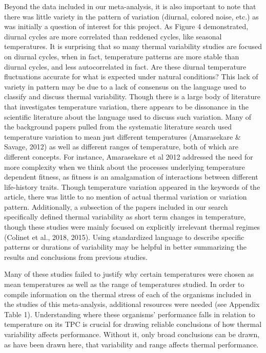 \documentclass[12pt,twoside]{reedthesis}
\begin{document}
Beyond the data included in our meta-analysis, it is also important to note that there was little variety in the pattern of variation (diurnal, colored noise, etc.) as was initially a question of interest for this project. As Figure 4 demonstrated, diurnal cycles are more correlated than reddened cycles, like seasonal temperatures. It is surprising that so many thermal variability studies are focused on diurnal cycles, when in fact, temperature patterns are more stable than diurnal cycles, and less autocorrelated in fact. Are these diurnal temperature fluctuations accurate for what is expected under natural conditions? This lack of variety in pattern may be due to a lack of consensus on the language used to classify and discuss thermal variability. Though there is a large body of literature that investigates temperature variation, there appears to be dissonance in the scientific literature about the language used to discuss such variation. Many of the background papers pulled from the systematic literature search used temperature variation to mean just different temperatures (Amarasekare \& Savage, 2012) as well as different ranges of temperature, both of which are different concepts. For instance, Amarasekare et al 2012 addressed the need for more complexity when we think about the processes underlying temperature dependent fitness, as fitness is an amalgamation of interactions between different life-history traits. Though temperature variation appeared in the keywords of the article, there was little to no mention of actual thermal variation or variation pattern. Additionally, a subsection of the papers included in our search specifically defined thermal variability as short term changes in temperature, though these studies were mainly focused on explicitly irrelevant thermal regimes (Colinet et al., 2018, 2015). Using standardized language to describe specific patterns or durations of variability may be helpful in better summarizing the results and conclusions from previous studies.

Many of these studies failed to justify why certain temperatures were chosen as mean temperatures as well as the range of temperatures studied. In order to compile information on the thermal stress of each of the organisms included in the studies of this meta-analysis, additional resources were needed (see Appendix Table 1). Understanding where these organisms' performance falls in relation to temperature on its TPC is crucial for drawing reliable conclusions of how thermal variability affects performance. Without it, only broad conclusions can be drawn, as have been drawn here, that variability and range affects thermal performance.
\end{document}
